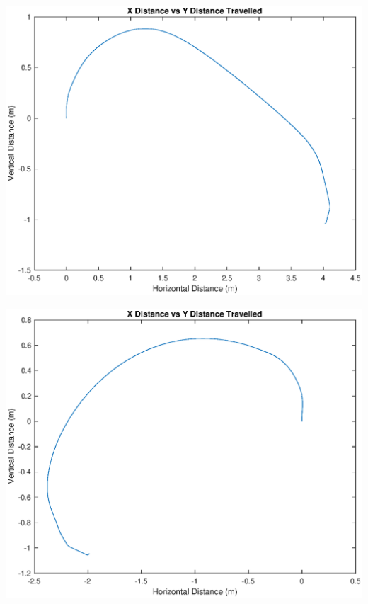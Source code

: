 \documentclass[10pt]{article}
\newcommand{\bigScale}{0.6}
\begin{document}
\includegraphics[scale=\bigScale]{./figures/task1_x-1y4.eps}

\includegraphics[scale=\bigScale]{./figures/task1_x-1y-2.eps}
\end{document}
